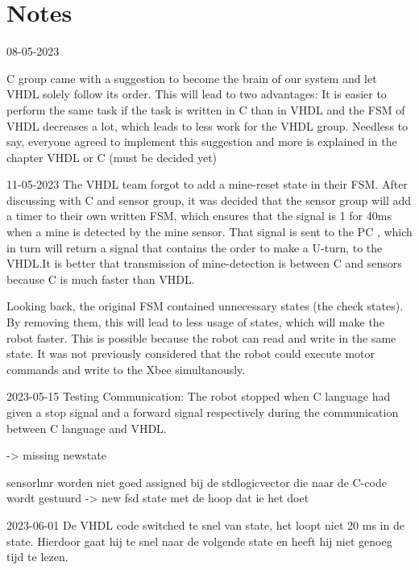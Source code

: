\chapter{Notes}

08-05-2023

C group came with a suggestion to become the brain of our system and let VHDL solely follow its order. This will lead to two advantages: It is easier to perform the same task if the task is written in C than in VHDL and the FSM of VHDL decreases a lot, which leads to less work for the VHDL group. Needless to say, everyone agreed to implement this suggestion and more is explained in the chapter VHDL or C (must be decided yet) \newline


11-05-2023
The VHDL team forgot to add a mine-reset state in their FSM. After discussing with C and sensor group, it was decided that the sensor group will add a timer to their own written FSM, which ensures that the signal is 1 for 40ms when a mine is detected by the mine sensor. That signal is sent to the PC , which in turn will return a signal that contains the order to make a U-turn, to the VHDL.It is better that transmission of mine-detection is between C and sensors because C is much faster  than VHDL.

Looking back, the original FSM contained unnecessary states (the check states). By removing them, this will lead to less usage of states, which will make the robot faster. This is possible because the robot can read and write in the same state. It was not previously considered that the robot could execute motor commands and write to the Xbee simultanously. 



2023-05-15
Testing Communication: 
The robot stopped when C language had given a stop signal and a forward signal respectively during the communication between C language and VHDL.

-> missing newstate

sensorlmr worden niet goed assigned bij de stdlogicvector die naar de C-code wordt gestuurd
-> new fsd state met de hoop dat ie het doet

2023-06-01
De VHDL code switched te snel van state, het loopt niet 20 ms in de state. Hierdoor gaat hij te snel naar de volgende state en heeft hij niet genoeg tijd te lezen.